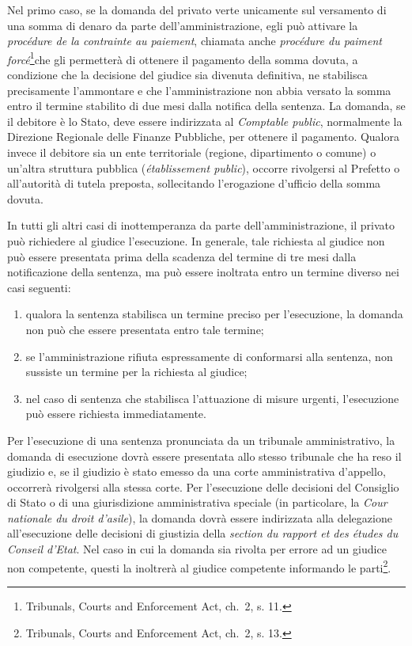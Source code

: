 \documentclass[12pt,it,a4paper,]{report}
\providecommand{\tightlist}{%
  \setlength{\itemsep}{0pt}\setlength{\parskip}{0pt}}
\begin{document}
Nel primo caso, se la domanda del privato verte unicamente sul
versamento di una somma di denaro da parte dell'amministrazione, egli
può attivare la \emph{procédure de la contrainte au paiement}, chiamata
anche \emph{procédure du paiment forcé}\footnote{Tribunals, Courts and
  Enforcement Act, ch.~2, s. 11.}che gli permetterà di ottenere il
pagamento della somma dovuta, a condizione che la decisione del giudice
sia divenuta definitiva, ne stabilisca precisamente l'ammontare e che
l'amministrazione non abbia versato la somma entro il termine stabilito
di due mesi dalla notifica della sentenza. La domanda, se il debitore è
lo Stato, deve essere indirizzata al \emph{Comptable public},
normalmente la Direzione Regionale delle Finanze Pubbliche, per ottenere
il pagamento. Qualora invece il debitore sia un ente territoriale
(regione, dipartimento o comune) o un'altra struttura pubblica
(\emph{établissement public}), occorre rivolgersi al Prefetto o
all'autorità di tutela preposta, sollecitando l'erogazione d'ufficio
della somma dovuta.

In tutti gli altri casi di inottemperanza da parte dell'amministrazione,
il privato può richiedere al giudice l'esecuzione. In generale, tale
richiesta al giudice non può essere presentata prima della scadenza del
termine di tre mesi dalla notificazione della sentenza, ma può essere
inoltrata entro un termine diverso nei casi seguenti:

\begin{enumerate}
\def\labelenumi{\arabic{enumi})}
\tightlist
\item
  qualora la sentenza stabilisca un termine preciso per l'esecuzione, la
  domanda non può che essere presentata entro tale termine;
\item
  se l'amministrazione rifiuta espressamente di conformarsi alla
  sentenza, non sussiste un termine per la richiesta al giudice;
\item
  nel caso di sentenza che stabilisca l'attuazione di misure urgenti,
  l'esecuzione può essere richiesta immediatamente.
\end{enumerate}

Per l'esecuzione di una sentenza pronunciata da un tribunale
amministrativo, la domanda di esecuzione dovrà essere presentata allo
stesso tribunale che ha reso il giudizio e, se il giudizio è stato
emesso da una corte amministrativa d'appello, occorrerà rivolgersi alla
stessa corte. Per l'esecuzione delle decisioni del Consiglio di Stato o
di una giurisdizione amministrativa speciale (in particolare, la
\emph{Cour nationale du droit d'asile}), la domanda dovrà essere
indirizzata alla delegazione all'esecuzione delle decisioni di giustizia
della \emph{section du rapport et des études du Conseil d'Etat}. Nel
caso in cui la domanda sia rivolta per errore ad un giudice non
competente, questi la inoltrerà al giudice competente informando le
parti\footnote{Tribunals, Courts and Enforcement Act, ch.~2, s. 13.}.
\end{document}
